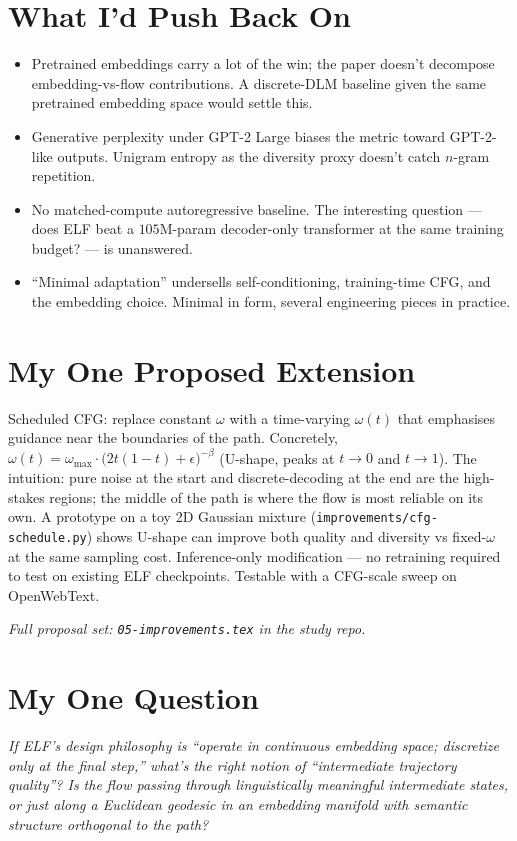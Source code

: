 \documentclass[10pt]{article}
\begin{document}
\section*{What I'd Push Back On}
\begin{itemize}
  \item Pretrained embeddings carry a lot of the win; the paper doesn't decompose embedding-vs-flow contributions. A discrete-DLM baseline given the same pretrained embedding space would settle this.
  \item Generative perplexity under GPT-2 Large biases the metric toward GPT-2-like outputs. Unigram entropy as the diversity proxy doesn't catch $n$-gram repetition.
  \item No matched-compute autoregressive baseline. The interesting question --- does ELF beat a $105$M-param decoder-only transformer at the same training budget? --- is unanswered.
  \item ``Minimal adaptation'' undersells self-conditioning, training-time CFG, and the embedding choice. Minimal in form, several engineering pieces in practice.
\end{itemize}

\section*{My One Proposed Extension}
Scheduled CFG: replace constant $\omega$ with a time-varying $\omega(t)$ that emphasises guidance near the boundaries of the path. Concretely, $\omega(t) = \omega_\text{max} \cdot \big(2 t (1-t) + \epsilon\big)^{-\beta}$ (U-shape, peaks at $t \to 0$ and $t \to 1$). The intuition: pure noise at the start and discrete-decoding at the end are the high-stakes regions; the middle of the path is where the flow is most reliable on its own. A prototype on a toy 2D Gaussian mixture (\texttt{improvements/cfg-schedule.py}) shows U-shape can improve both quality and diversity vs fixed-$\omega$ at the same sampling cost. Inference-only modification --- no retraining required to test on existing ELF checkpoints. Testable with a CFG-scale sweep on OpenWebText.

\emph{Full proposal set: \texttt{05-improvements.tex} in the study repo.}

\section*{My One Question}
\emph{If ELF's design philosophy is ``operate in continuous embedding space; discretize only at the final step,'' what's the right notion of ``intermediate trajectory quality''? Is the flow passing through linguistically meaningful intermediate states, or just along a Euclidean geodesic in an embedding manifold with semantic structure orthogonal to the path?}
\end{document}
